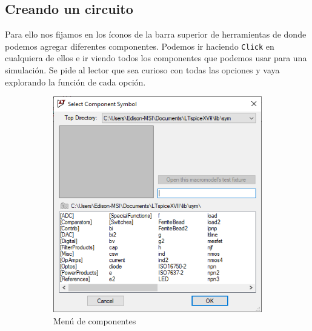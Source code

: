 \documentclass[a4paper]{article} %
\begin{document}
\subsection{Creando un circuito}
Para ello nos fijamos en los íconos de la barra superior de herramientas de donde podemos agregar diferentes componentes. Podemos ir haciendo \texttt{Click} en cualquiera de ellos e ir viendo todos los componentes que podemos usar para una simulación. Se pide al lector que sea curioso con todas las opciones y vaya explorando la función de cada opción. 

\begin{figure}
	\centering
	\begin{subfigure}[b]{0.45\textwidth}
		\centering
		\includegraphics[scale=0.5]{IMAGENES/img3} %
		\caption{Menú de componentes} %
		\label{img3} %
	\end{subfigure}
\hfill
	\begin{subfigure}[b]{0.45\textwidth}
		\centering

\end{subfigure}
\end{figure}
\end{document}
